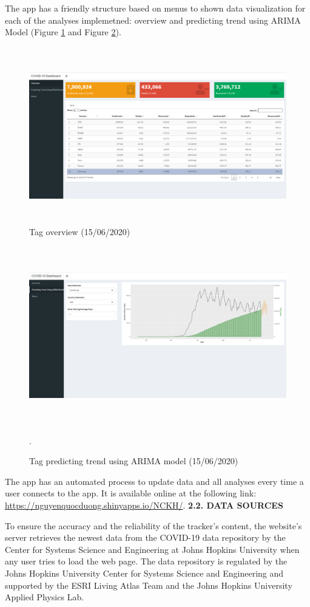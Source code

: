 \documentclass[12pt, a4paper,oneside]{book}
\theoremstyle{definition}
\begin{document}
The app has a friendly structure based on menus to shown data visualization for each of the analyses implemetned: overview and predicting trend using ARIMA Model (Figure \ref{D1} and Figure \ref{D2}).
\begin{figure}[!htb]
	\centering
	\includegraphics[width=1\linewidth,height=7.7cm]{anh/D1}
	\vskip-4mm 
	\caption{Tag overview (15/06/2020)}  
	\label{D1}
\end{figure}
\begin{figure}[!htb]
	\centering
	\includegraphics[width=1\linewidth,height=7.7cm]{anh/D2}
	\vskip-4mm 
	\caption{Tag predicting trend using ARIMA model (15/06/2020)}.  
	\label{D2}
\end{figure}

The app has an automated process to update data and all analyses every time a user connects to the app. It is available online at the following link: \url{https://nguyenquocduong.shinyapps.io/NCKH/}.
\vskip 0.5cm
\noindent 
{\bf 2.2. DATA SOURCES}

To ensure the accuracy and the reliability of the tracker's content, the website's server retrieves the newest data from the COVID-19 data repository by the Center for Systems Science and Engineering at Johns Hopkins University when any user tries to load the web page. The data repository is regulated by the Johns Hopkins University Center for Systems Science and Engineering and supported by the ESRI Living Atlas Team and the Johns Hopkins University Applied Physics Lab.
\end{document}
